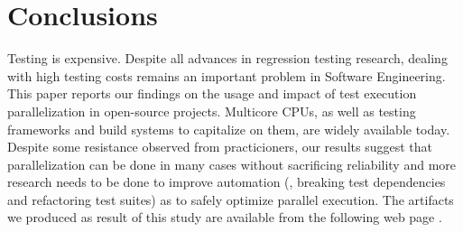\section{Conclusions}

Testing is expensive.  Despite all advances in regression testing
research, dealing with high testing costs remains an important problem
in Software Engineering.  This paper reports our findings on the usage
and impact of test execution parallelization in open-source projects.
Multicore CPUs, as well as testing frameworks and build systems to
capitalize on them, are widely available today.  Despite some
resistance observed from practicioners, our results suggest that
parallelization can be done in many cases without sacrificing
reliability and more research needs to be done to improve automation
(\eg{}, breaking test dependencies and refactoring test suites) as to
safely optimize parallel execution.  The artifacts we produced as
result of this study are available from the following web
page \webpage{}.







